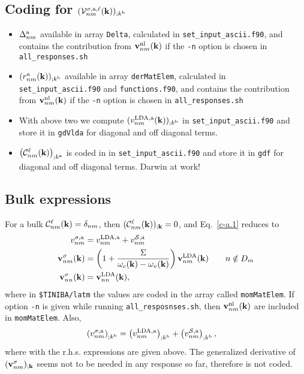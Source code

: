\subsection{Coding for $({\mathbf{\cal V}}^{\sigma,\mathrm{a},\ell}_{nm}(\mathbf{k}))_{;k^{\mathrm{b}}}$}
\begin{itemize}
\item $\Delta^{\mathrm{a}}_{nm}$ available in array \verb=Delta=, 
calculated in \verb=set_input_ascii.f90=,
 and contains the
  contribution from $\mathbf{v}^{\mathrm{nl}}_{nm}(\mathbf{k})$ if the \verb=-n= option is
  chosen in \verb=all_responses.sh= 
\item $(r^{\mathrm{a}}_{nm}(\mathbf{k}))_{;k^{\mathrm{b}}}$
 available in array
  \verb=derMatElem=,
calculated in \verb=set_input_ascii.f90= and \verb=functions.f90=,
 and contains the
  contribution from $\mathbf{v}^{\mathrm{nl}}_{nm}(\mathbf{k})$ if the \verb=-n= option is
  chosen in \verb=all_responses.sh= 
\item With above two we compute $(v^{\mathrm{LDA},\mathrm{a}}_{nm}(\mathbf{k}))_{;k^{\mathrm{b}}}$ 
in \verb=set_input_ascii.f90=  and store it in \verb=gdVlda= for
diagonal and off diagonal terms.
\item $\big({\mathbf{\cal C}}^\ell_{nm}(\mathbf{k})\big)_{;k^{\mathrm{a}}}$ is coded in 
in \verb=set_input_ascii.f90=  and store it in \verb=gdf= for
diagonal and off diagonal terms. Darwin at work!
\end{itemize}



\subsection{Bulk expressions}

For a bulk ${\mathbf{\cal C}}^\ell_{nm}(\mathbf{k})=\delta_{nm}$, then
$({\mathbf{\cal C}}^\ell_{nm}(\mathbf{k}))_{;\mathbf{k}}=0$, and Eq.~\eqref{c-a.1} reduces to
\begin{align}\label{choni.9}
v^{\sigma,\mathrm{a}}_{nm}
&=
v^{\mathrm{LDA},\mathrm{a}}_{nm}
+
v^{{\cal S},\mathrm{a}}_{nm}
\nonumber\\
\mathbf{v}^\sigma_{nm}(\mathbf{k})
&=
\left(1+\frac{\Sigma}{\omega_c(\mathbf{k})-\omega_v(\mathbf{k})}\right)\mathbf{v}^{\mathrm{LDA}}_{nm}(\mathbf{k})
\quad\quad n\notin D_m
\nonumber\\
\mathbf{v}^\sigma_{nn}(\mathbf{k})
&=
\mathbf{v}^{\mathrm{LDA}}_{nn}(\mathbf{k})
,
\end{align}
where in \verb=$TINIBA/latm= the values are coded in the array
called
\verb=momMatElem=.  
If option \verb=-n= is given while running
\verb=all_resposnses.sh=, then $\mathbf{v}^{\mathrm{nl}}_{nm}(\mathbf{k})$ are included in 
\verb=momMatElem=. 
Also,
\begin{align}\label{c-a.1nn}
\left(
v^{\sigma,\mathrm{a}}_{nm}
\right)_{;k^{\mathrm{b}}}
&=
\left(
v^{\mathrm{LDA},\mathrm{a}}_{nm}
\right)_{;k^{\mathrm{b}}}
+
\left(
v^{{\cal S},\mathrm{a}}_{nm}
\right)_{;k^{\mathrm{b}}}
,
\end{align}
where with the r.h.s. expressions are given above. The generalized
derivative of $(\mathbf{v}^\sigma_{nm})_{;\mathbf{k}}$ seems not to be needed  in any
response so far, therefore is not coded.
